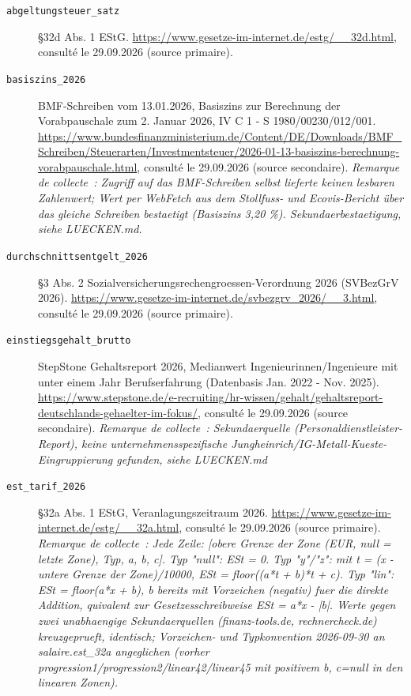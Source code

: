 \begin{description}
\item[\texttt{abgeltungsteuer\_satz}] \label{src:abgeltungsteuer_satz} §32d Abs. 1 EStG. \url{https://www.gesetze-im-internet.de/estg/__32d.html}, consulté le 29.09.2026 (source primaire).
\item[\texttt{basiszins\_2026}] \label{src:basiszins_2026} BMF-Schreiben vom 13.01.2026, Basiszins zur Berechnung der Vorabpauschale zum 2. Januar 2026, IV C 1 - S 1980/00230/012/001. \url{https://www.bundesfinanzministerium.de/Content/DE/Downloads/BMF_Schreiben/Steuerarten/Investmentsteuer/2026-01-13-basiszins-berechnung-vorabpauschale.html}, consulté le 29.09.2026 (source secondaire). \textit{Remarque de collecte~: Zugriff auf das BMF-Schreiben selbst lieferte keinen lesbaren Zahlenwert; Wert per WebFetch aus dem Stollfuss- und Ecovis-Bericht über das gleiche Schreiben bestaetigt (Basiszins 3,20 \%). Sekundaerbestaetigung, siehe LUECKEN.md.}
\item[\texttt{durchschnittsentgelt\_2026}] \label{src:durchschnittsentgelt_2026} §3 Abs. 2 Sozialversicherungsrechengroessen-Verordnung 2026 (SVBezGrV 2026). \url{https://www.gesetze-im-internet.de/svbezgrv_2026/__3.html}, consulté le 29.09.2026 (source primaire).
\item[\texttt{einstiegsgehalt\_brutto}] \label{src:einstiegsgehalt_brutto} StepStone Gehaltsreport 2026, Medianwert Ingenieurinnen/Ingenieure mit unter einem Jahr Berufserfahrung (Datenbasis Jan. 2022 - Nov. 2025). \url{https://www.stepstone.de/e-recruiting/hr-wissen/gehalt/gehaltsreport-deutschlands-gehaelter-im-fokus/}, consulté le 29.09.2026 (source secondaire). \textit{Remarque de collecte~: Sekundaerquelle (Personaldienstleister-Report), keine unternehmensspezifische Jungheinrich/IG-Metall-Kueste-Eingruppierung gefunden, siehe LUECKEN.md}
\item[\texttt{est\_tarif\_2026}] \label{src:est_tarif_2026} §32a Abs. 1 EStG, Veranlagungszeitraum 2026. \url{https://www.gesetze-im-internet.de/estg/__32a.html}, consulté le 29.09.2026 (source primaire). \textit{Remarque de collecte~: Jede Zeile: [obere Grenze der Zone (EUR, null = letzte Zone), Typ, a, b, c]. Typ "null": ESt = 0. Typ "y"/"z": mit t = (x - untere Grenze der Zone)/10000, ESt = floor((a*t + b)*t + c). Typ "lin": ESt = floor(a*x + b), b bereits mit Vorzeichen (negativ) fuer die direkte Addition, quivalent zur Gesetzesschreibweise ESt = a*x - |b|. Werte gegen zwei unabhaengige Sekundaerquellen (finanz-tools.de, rechnercheck.de) kreuzgeprueft, identisch; Vorzeichen- und Typkonvention 2026-09-30 an salaire.est\_32a angeglichen (vorher progression1/progression2/linear42/linear45 mit positivem b, c=null in den linearen Zonen).}

\end{description}
